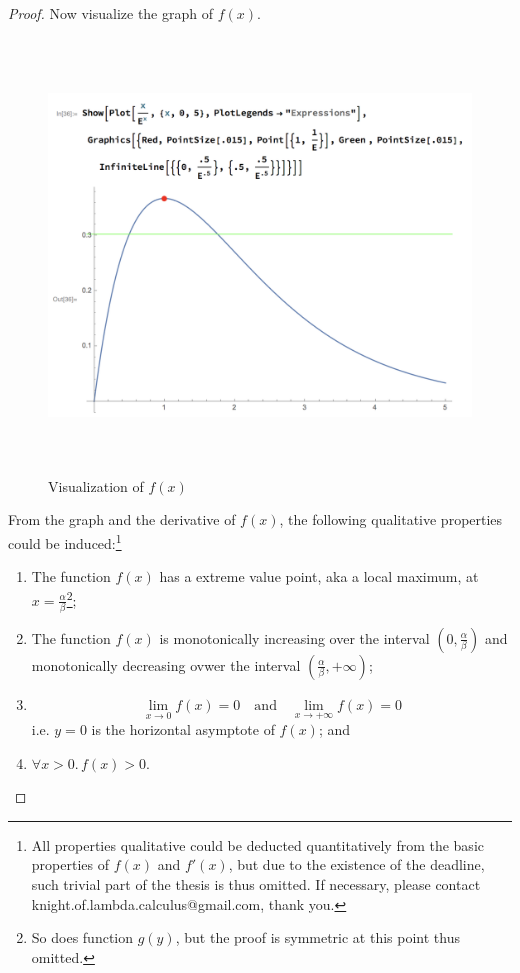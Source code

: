 \documentclass{article}
\begin{document}
\begin{proof}
Now visualize the graph of $f(x)$.
\begin{figure}[!htbp]
    \centering
    \includegraphics[height=11.5cm]{Lotka-Volterra-ComponentX.png}
    \caption{Visualization of $f(x)$}
    \label{fig:lotka_volterra_componentx}
\end{figure}
From the graph and the derivative of $f(x)$, the following qualitative properties could be induced:\footnote{All properties qualitative could be deducted quantitatively from the basic properties of $f(x)$ and $f'(x)$, but due to the existence of the deadline, such trivial part of the thesis is thus omitted. If necessary, please contact knight.of.lambda.calculus@gmail.com, thank you.}
\begin{enumerate}
\item The function $f(x)$ has a extreme value point, aka a local maximum, at $x=\displaystyle{\frac{\alpha}{\beta}}$\footnote{So does function $g(y)$, but the proof is symmetric at this point thus omitted.};
\item The function $f(x)$ is monotonically increasing over the interval $\displaystyle{\left(0,\frac{\alpha}{\beta}\right)}$ and monotonically decreasing ovwer the interval $\displaystyle{\left(\frac{\alpha}{\beta},+\infty\right)}$;
\item $$\lim_{x\to0}f(x)=0\mathrm{\quad and\quad}\lim_{x\to+\infty}f(x)=0$$i.e. $y=0$ is the horizontal asymptote of $f(x)$; and
\item $\forall x>0.\,f(x)>0$.
\end{enumerate}

\end{proof}
\end{document}
